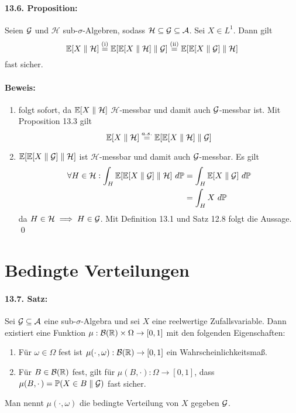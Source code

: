     \paragraph{13.6. Proposition:}Seien $\mathcal{G}$ und $\mathcal{H}$ sub-$\sigma$-Algebren, sodass $\mathcal{H}\subseteq\mathcal{G}\subseteq\mathcal{A}$. Sei $X\in L^1$. Dann gilt
     $$\mathbb{E}[X\parallel\mathcal{H}]\overset{\text{(i)}}{=}\mathbb{E}[\mathbb{E}[X\parallel\mathcal{H}]\parallel\mathcal{G}]\overset{\text{(ii)}}{=}\mathbb{E}[\mathbb{E}[X\parallel\mathcal{G}]\parallel\mathcal{H}]$$
     fast sicher.
     
     \paragraph{Beweis:}
     \begin{enumerate}[label=(\roman*)]
         \item folgt sofort, da $\mathbb{E}[X\parallel\mathcal{H}]$ $\mathcal{H}$-messbar und damit auch $\mathcal{G}$-messbar ist. Mit Proposition 13.3 gilt
         $$\mathbb{E}[X\parallel\mathcal{H}]\overset{a.s.}{=}\mathbb{E}[\mathbb{E}[X\parallel\mathcal{H}]\parallel\mathcal{G}]$$
         \item $\mathbb{E}[\mathbb{E}[X\parallel\mathcal{G}]\parallel\mathcal{H}]$ ist $\mathcal{H}$-messbar und damit auch $\mathcal{G}$-messbar. Es gilt
         \begin{align*}
             \forall H\in\mathcal{H}:\int_H\E[\E[X\parallel\G]\parallel\mathcal{H}]\ d\Pp&=\int_H\E[X\parallel\G]\ d\Pp\\
             &=\int_H X\ d\Pp
         \end{align*}
         da $H\in\mathcal{H}\implies H\in\mathcal{G}$. Mit Definition 13.1 und Satz 12.8 folgt die Aussage. \qed
    \end{enumerate}
    
    \section*{Bedingte Verteilungen}
    
    \paragraph{13.7. Satz:} Sei $\mathcal{G}\subseteq\mathcal{A}$ eine sub-$\sigma$-Algebra und sei $X$ eine reelwertige Zufallsvariable. Dann existiert eine Funktion $\mu:\mathcal{B}(\mathbb{R})\times\Omega\to[0,1]$ mit den folgenden Eigenschaften:
    \begin{enumerate}[label=(\roman*)]
        \item F\"ur $\omega\in\Omega$ fest ist $\mu(\cdotp,\omega):\mathcal{B}(\mathbb{R})\to[0,1]$ ein Wahrscheinlichkeitsmaß.
        \item F\"ur $B\in\mathcal{B}(\mathbb{R})$ fest, gilt f\"ur $\mu(B,\cdotp):\Omega\to[0,1]$, dass $\mu(B,\cdotp)=\mathbb{P}(X\in B\parallel\mathcal{G})$ fast sicher. 
    \end{enumerate} 
    Man nennt $\mu(\cdotp,\omega)$ die bedingte Verteilung von $X$ gegeben $\mathcal{G}$.
    
